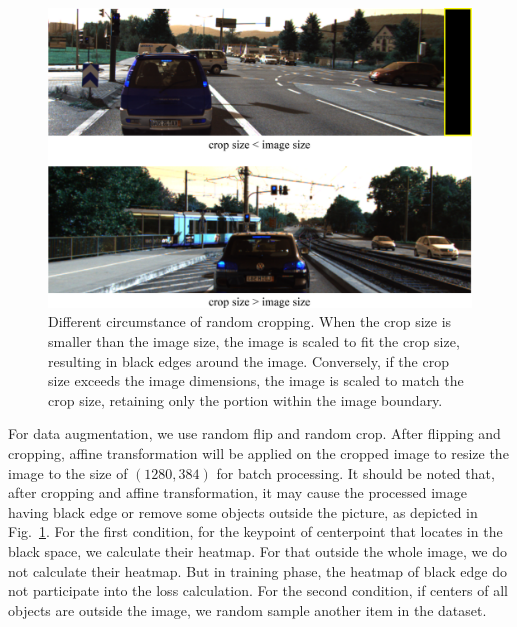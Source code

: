 \documentclass[journal]{IEEEtran}
\begin{document}
	
	\begin{figure}[!t]
		\centering
		\includegraphics[width=1.0\linewidth]{affine.eps}
		\caption{Different circumstance of random cropping. When the crop size is smaller than the image size, the image is scaled to fit the crop size, resulting in black edges around the image. Conversely, if the crop size exceeds the image dimensions, the image is scaled to match the crop size, retaining only the portion within the image boundary.}
		\label{fig:affine trans}
	\end{figure}
	For data augmentation, we use random flip and random crop. After flipping and cropping, affine transformation will be applied on the cropped image to resize the image to the size of $(1280, 384)$ for batch processing. It should be noted that, after cropping and affine transformation, it may cause the processed image having black edge or remove some objects outside the picture, as depicted in Fig.~\ref{fig:affine trans}. For the first condition, for the keypoint of centerpoint that locates in the black space, we calculate their heatmap. For that outside the whole image, we do not calculate their heatmap. But in training phase, the heatmap of black edge do not participate into the loss calculation. For the second condition, if centers of all objects are outside the image, we random sample another item in the dataset.
	
\end{document}
